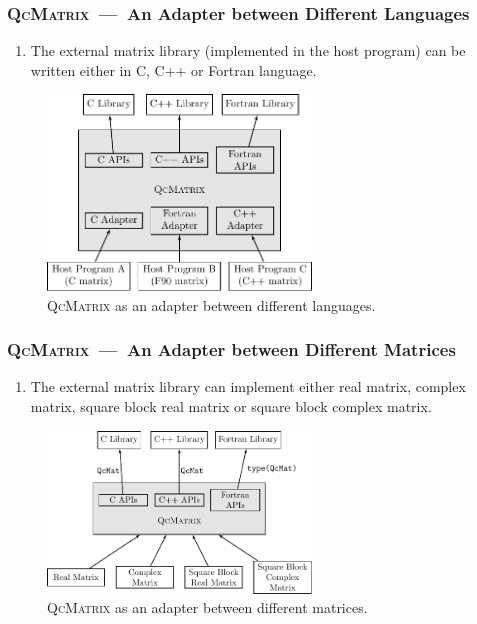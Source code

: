 \documentclass[10pt]{beamer}
\begin{document}
{{\begin{frame}
  \frametitle<presentation>{\textsc{QcMatrix}~---~An Adapter between Different Languages}
  \begin{enumerate}
    \item The external matrix library (implemented in the host program) can be written
      either in C, C++ or Fortran language.
  \end{enumerate}
  \begin{figure}[htbp]
    \centering
    \includegraphics[width=7cm]{lang_adapter.pdf}
    \caption{\textsc{QcMatrix} as an adapter between different languages.}
    \label{fig-lang-adapter}
  \end{figure}
\end{frame}

\begin{frame}
  \frametitle<presentation>{\textsc{QcMatrix}~---~An Adapter between Different Matrices}
  \begin{enumerate}
    \item The external matrix library can implement either real matrix, complex matrix,
      square block real matrix or square block complex matrix.
  \end{enumerate}
  \begin{figure}[htbp]
    \centering
    \includegraphics[width=7cm]{matrix_adapter.pdf}
    \caption{\textsc{QcMatrix} as an adapter between different matrices.}
    \label{fig-lang-matrix}
  \end{figure}
\end{frame}

}}
\end{document}
